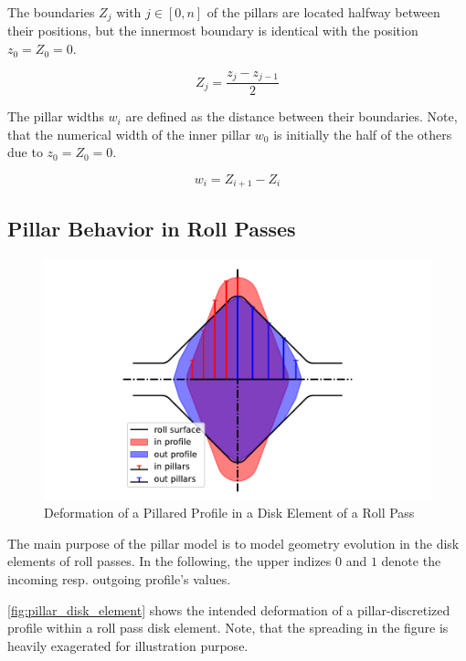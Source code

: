 \documentclass[11pt]{PyRollDocs}
\begin{document}
    The boundaries $Z_j$ with $j \in [0, n]$ of the pillars are located halfway between their positions, but the innermost boundary is identical with the position $z_0 = Z_0 = 0$.

    \begin{equation}
        Z_j = \frac{z_j - z_{j-1}}{2}
        \label{eq:pillar_boundaries}
    \end{equation}

    The pillar widths $w_i$ are defined as the distance between their boundaries.
    Note, that the numerical width of the inner pillar $w_0$ is initially the half of the others due to $z_0 = Z_0 = 0$.

    \begin{equation}
        w_i = Z_{i+1} - Z_i
        \label{eq:pillar_widths}
    \end{equation}

    \subsection{Pillar Behavior in Roll Passes}\label{subsec:pillar-behavior-in-roll-passes}

    \begin{figure}
        \centering
        \includegraphics[width=0.6\linewidth]{img/pillar_disk_element}
        \caption{Deformation of a Pillared Profile in a Disk Element of a Roll Pass}
        \label{fig:pillar_disk_element}
    \end{figure}

    The main purpose of the pillar model is to model geometry evolution in the disk elements of roll passes.
    In the following, the upper indizes $0$ and $1$ denote the incoming resp. outgoing profile's values.

    \autoref{fig:pillar_disk_element} shows the intended deformation of a pillar-discretized profile within a roll pass disk element.
    Note, that the spreading in the figure is heavily exagerated for illustration purpose.
\end{document}
